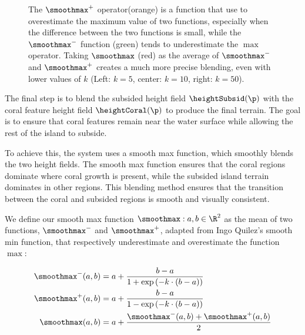 \begin{figure}[H]

    \caption{The $\smoothmax^+$ operator(orange) is a function that use to overestimate the maximum value of two functions, especially when the difference between the two functions is small, while the $\smoothmax^-$ function (green) tends to underestimate the $\max$ operator. Taking $\smoothmax$ (red) as the average of $\smoothmax^-$ and $\smoothmax^+$ creates a much more precise blending, even with lower values of $k$ (Left: $k=5$, center: $k=10$, right: $k=50$).}
    \label{fig:coral-island-blend-function-island-with-upper}
\end{figure}

The final step is to blend the subsided height field $\heightSubsid(\p)$ with the coral feature height field $\heightCoral(\p)$ to produce the final terrain. The goal is to ensure that coral features remain near the water surface while allowing the rest of the island to subside.

To achieve this, the system uses a smooth max function, which smoothly blends the two height fields. The smooth max function ensures that the coral regions dominate where coral growth is present, while the subsided island terrain dominates in other regions. This blending method ensures that the transition between the coral and subsided regions is smooth and visually consistent.

We define our smooth max function $\smoothmax: a, b \in \R^2$ as the mean of two functions, $\smoothmax^-$ and $\smoothmax^+$, adapted from Ingo Quilez's smooth min function, that respectively underestimate and overestimate the function $\max$:

\begin{align}
    \smoothmax^-(a, b) &= a + \frac{b - a}{1 + \exp\left(-k \cdot (b - a) \right)} \\
    \smoothmax^+(a, b) &= a + \frac{b - a}{1 - \exp\left(-k \cdot (b - a) \right)} \\
    \smoothmax(a, b)   &= a + \frac{\smoothmax^-(a, b) + \smoothmax^+(a, b)}{2} %
\end{align}


